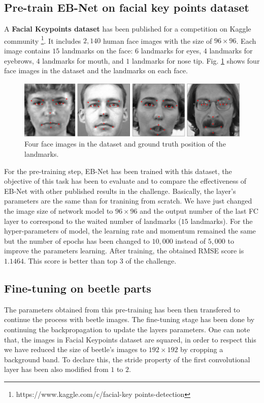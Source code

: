 \documentclass[review]{elsarticle}
\begin{document}
\subsection{Pre-train EB-Net on facial key points dataset}
A \textbf{Facial Keypoints dataset} has been published for a competition on Kaggle community \footnote{https://www.kaggle.com/c/facial-key points-detection}. It includes $2,140$ human face images with the size of $96 \times 96$. Each image contains $15$ landmarks on the face: $6$ landmarks for eyes, $4$ landmarks for eyebrows, $4$ landmarks for mouth, and $1$ landmarks for nose tip. Fig. \ref{figaface} shows four face images in the dataset and the landmarks on each face.

\begin{figure}[htbp]
	\centerline{\includegraphics[scale=0.16]{images/face_dataset_2.png}}
	\caption{Four face images in the dataset and ground truth position of the landmarks.}
	\label{figaface}
\end{figure}

For the pre-training step, EB-Net has been trained with this dataset, the objective of this task has been to evaluate and to compare the effectiveness of EB-Net with other published results in the challenge. Basically, the layer's parameters are the same than for tranining from scratch. We have just changed the image size of network model to $96 \times 96$ and the output number of the last FC layer to correspond to the waited number of landmarks ($15$ landmarks). For the hyper-parameters of model, the learning rate and momentum remained the same but the number of epochs has been changed to $10,000$ instead of $5,000$ to improve the parameters learning. After training, the obtained RMSE score is $1.1464$. This score is better than top $3$ of the challenge.
\subsection{Fine-tuning on beetle parts}
The parameters obtained from this pre-training has been then transfered to continue the process with beetle images. The fine-tuning stage has been done by continuing the backpropagation to update the layers parameters. One can note that, the images in Facial Keypoints dataset are squared, in order to respect this we have reduced the size of beetle's images to $192 \times 192$ by cropping a background band. To declare this, the stride property of the first convolutional layer has been also modified from $1$ to $2$.
\end{document}
